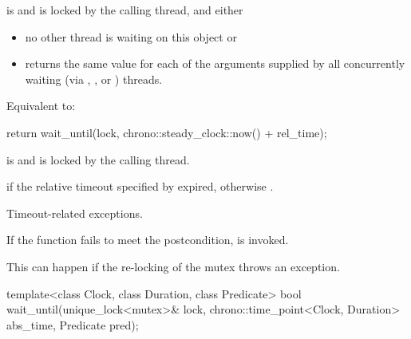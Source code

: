 \begin{itemdescr}
\pnum
\expects
{} is  and 
is locked by the calling thread, and either
\begin{itemize}
\item no other thread is waiting on this  object or
\item {} returns the same value for each of the  arguments
supplied by all concurrently waiting (via , , or
) threads.
\end{itemize}

\pnum
\effects
Equivalent to:
\begin{codeblock}
return wait_until(lock, chrono::steady_clock::now() + rel_time);
\end{codeblock}

\pnum
\ensures
{} is  and 
is locked by the calling thread.

\pnum
\returns
{} if
the relative timeout specified by  expired,
otherwise .

\pnum
\throws
Timeout-related
exceptions.

\pnum
\remarks
If the function fails to meet the postcondition, 
is invoked.
\begin{note}
This can happen if the re-locking of the mutex throws an exception.
\end{note}
\end{itemdescr}

%
\begin{itemdecl}
template<class Clock, class Duration, class Predicate>
  bool wait_until(unique_lock<mutex>& lock,
                  chrono::time_point<Clock, Duration> abs_time,
                  Predicate pred);
\end{itemdecl}

